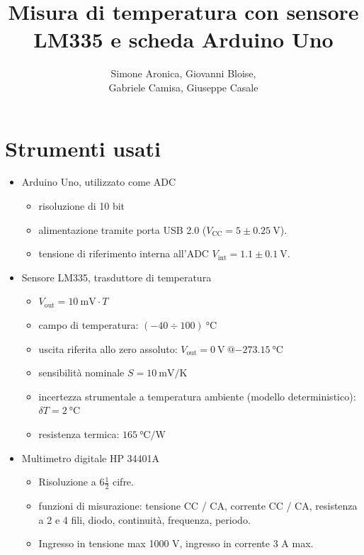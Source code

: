 \documentclass{article}
\title{Misura di temperatura con
sensore LM335 e
scheda Arduino Uno}
\author{Simone Aronica, Giovanni Bloise, \\
Gabriele Camisa, Giuseppe Casale}
\date{}
\begin{document}
\maketitle
\tableofcontents
\pagebreak

\section{Strumenti usati}
\begin{itemize}
    \item Arduino Uno, utilizzato come ADC 
    \begin{itemize}
        \item risoluzione di 10 bit 
        \item alimentazione tramite porta USB 2.0 ($V_{\text{CC}} = 5 \pm \SI{0.25}{\volt}$).
        \item tensione di riferimento interna all'ADC $V_{\text{int}} = 1.1 \pm \SI{0.1}{\volt}$.
    \end{itemize}
    \item Sensore LM335, trasduttore di temperatura 
    \begin{itemize}
        \item $V_{\text{out}} = \SI{10}{\milli\volt} \cdot T$
        \item campo di temperatura: $(-40\div100)\SI{}{\celsius}$
        \item uscita riferita allo zero assoluto: $V_{\text{out}} = \SI{0}{\volt}\ @ \SI{-273,15}{\celsius}$
        \item sensibilità nominale $S = \SI{10}{\milli\volt\per\kelvin}$
        \item incertezza strumentale a temperatura ambiente (modello deterministico): $\delta T = \SI{2}{\celsius}$
        \item resistenza termica: $\SI{165}{\celsius\per\watt}$
    \end{itemize}
    \item Multimetro digitale HP 34401A
    \begin{itemize}
        \item Risoluzione a 6$\frac{1}{2}$ cifre.
        \item funzioni di misurazione: tensione CC / CA, corrente CC / CA, resistenza a 2 e 4 fili, diodo, continuità, frequenza, periodo.
        \item Ingresso in tensione max 1000 V, ingresso in corrente 3 A max.
    \end{itemize}

\end{itemize}
\end{document}
